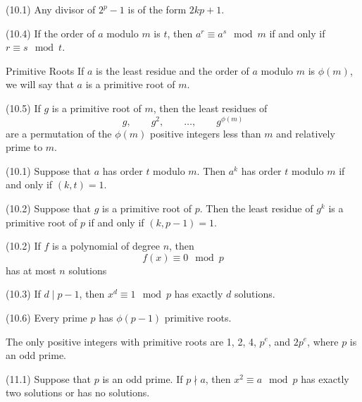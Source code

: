 \documentclass[12pt]{article}
\begin{document}
\begin{corollary}{(10.1)}{}
    Any divisor of $ 2^p - 1 $ is of the form $ 2kp + 1 $.
\end{corollary}
\begin{theorem}{(10.4)}{}
    If the order of $ a $ modulo $ m $ is $ t $, then $ a^r \equiv a^s \mod m $ if and only if $ r \equiv s \mod t $.
\end{theorem}
\begin{definition}{Primitive Roots}{}
    If $ a $ is the least residue and the order of $ a $ modulo $ m $ is $ \phi \left( m \right) $, we will say that $ a $ is a primitive root of $ m $.
\end{definition}
\begin{theorem}{(10.5)}{}
    If $ g $ is a primitive root of $ m $, then the least residues of
    \[ g, \qquad g^2, \qquad \dots, \qquad g^{\phi \left( m \right)} \]
    are a permutation of the $ \phi \left( m \right) $ positive integers less than $ m $ and relatively prime to $ m $.
\end{theorem}
\begin{lemma}{(10.1)}{}
    Suppose that $ a $ has order $ t $ modulo $ m $. Then $ a^k $ has order $ t $ modulo $ m $ if and only if $ \left( k, t \right) = 1 $.
\end{lemma}
\begin{corollary}{(10.2)}{}
    Suppose that $ g $ is a primitive root of $ p $. Then the least residue of $ g^k $ is a primitive root of $ p $ if and only if $ \left( k, p-1 \right) = 1 $.
\end{corollary}
\begin{lemma}{(10.2)}{}
    If $ f $ is a polynomial of degree $ n $, then
    \[ f \left( x \right) \equiv 0 \mod p \]
    has at most $ n $ solutions
\end{lemma}
\begin{lemma}{(10.3)}{}
    If $ d \mid p - 1 $, then $ x^d \equiv 1 \mod p $ has exactly $ d $ solutions.
\end{lemma}
\begin{theorem}{(10.6)}{}
    Every prime $ p $ has $ \phi \left( p - 1 \right) $ primitive roots.
\end{theorem}
\begin{theorem}{}{}
    The only positive integers with primitive roots are 1, 2, 4, $ p^e $, and $ 2p^e $, where $ p $ is an odd prime.
\end{theorem}
\begin{theorem}{(11.1)}{}
    Suppose that $ p $ is an odd prime. If $ p \nmid a $, then $ x^2 \equiv a \mod p $ has exactly two solutions or has no solutions.
\end{theorem}
\end{document}
